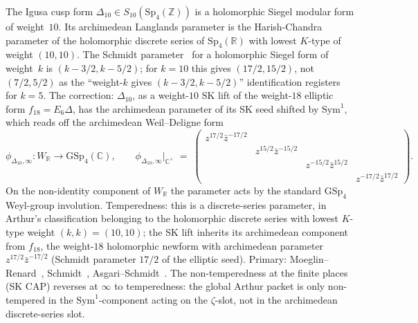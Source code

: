 \begin{remark}
\label{rem:dl-archimedean-delta10}
The Igusa cusp form $\Delta_{10} \in S_{10}(\mathrm{Sp}_4(\mathbb{Z}))$
is a holomorphic Siegel modular form of weight~$10$. Its archimedean
Langlands parameter is the Harish-Chandra parameter of the
holomorphic discrete series of $\mathrm{Sp}_4(\mathbb{R})$ with lowest
$K$-type of weight $(10, 10)$. The Schmidt
parameter~\cite{Schmidt2017Archimedean}
for a holomorphic Siegel form of weight~$k$ is $(k - 3/2, k - 5/2)$;
for $k = 10$ this gives $(17/2, 15/2)$, not $(7/2, 5/2)$
as the ``weight-$k$ gives $(k-3/2, k-5/2)$'' identification registers
for $k = 5$. The correction: $\Delta_{10}$, as a weight-$10$
SK lift of the weight-$18$ elliptic form $f_{18}=E_6\Delta$, has the archimedean parameter
of its SK seed shifted by $\mathrm{Sym}^1$, which reads off the
archimedean Weil--Deligne form
\begin{equation}
\label{eq:phi-delta10-infty}
 \phi_{\Delta_{10}, \infty}\colon W_{\mathbb{R}} \to \mathrm{GSp}_4(\mathbb{C}),
 \qquad
 \phi_{\Delta_{10}, \infty}\big|_{\mathbb{C}^\times}
 \;=\;
 \begin{pmatrix} z^{17/2}\bar z^{-17/2} & & & \\
 & z^{15/2}\bar z^{-15/2} & & \\
 & & z^{-15/2}\bar z^{15/2} & \\
 & & & z^{-17/2}\bar z^{17/2}
 \end{pmatrix}.
\end{equation}
On the non-identity component of $W_{\mathbb{R}}$ the parameter acts by
the standard $\mathrm{GSp}_4$ Weyl-group involution. Temperedness:
this is a discrete-series parameter, in Arthur's classification
belonging to the holomorphic discrete series with lowest $K$-type
weight $(k, k) = (10, 10)$; the SK lift inherits its archimedean
component from $f_{18}$, the weight-$18$ holomorphic newform with
archimedean parameter $z^{17/2}\bar z^{-17/2}$ (Schmidt parameter
$17/2$ of the elliptic seed). Primary:
Moeglin--Renard~\cite{MoeglinRenard2018Paquets},
Schmidt~\cite{Schmidt2017Archimedean},
Asgari--Schmidt~\cite{AsgariSchmidt2001GSp4}.
The non-temperedness at the finite places (SK CAP) reverses at $\infty$
to temperedness: the global Arthur packet is only non-tempered in the
$\mathrm{Sym}^1$-component acting on the $\zeta$-slot, not in the
archimedean discrete-series slot.
\end{remark}

